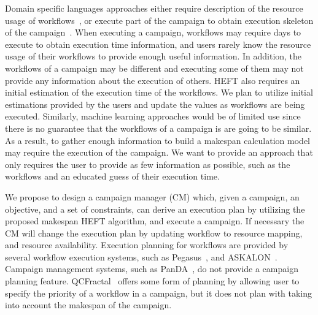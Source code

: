 Domain specific languages approaches either require description of the resource usage of workflows~\cite{carothers2017durango}, or execute part of the campaign to obtain execution skeleton of the campaign~\cite{maheshwari2016workflow}.
When executing a campaign, workflows may require days to execute to obtain execution time information, and users rarely know the resource usage of their workflows to provide enough useful information.
In addition, the workflows of a campaign may be different and executing some of them may not provide any information about the execution of others.
HEFT also requires an initial estimation of the execution time of the workflows. We plan to utilize initial estimations provided by the users and update the values as workflows are being executed.
Similarly, machine learning approaches would be of limited use since there is no guarantee that the workflows of a campaign is are going to be similar.
As a result, to gather enough information to build a makespan calculation model may require the execution of the campaign.
We want to provide an approach that only requires the user to provide as few information as possible, such as the workflows and an educated guess of their execution time.

We propose to design a campaign manager (CM) which, given a campaign, an objective, and a set of constraints, can derive an execution plan by utilizing the proposed makespan HEFT algorithm, and execute a campaign.
If necessary the CM will change the execution plan by updating workflow to resource mapping, and resource availability.
Execution planning for workflows are provided by several workflow execution systems, such as Pegasus~\cite{deelman2015pegasus}, and ASKALON~\cite{fahringer2005askalon}.
Campaign management systems, such as PanDA~\cite{maeno2008panda}, do not provide a campaign planning feature.
QCFractal~\cite{qcfractal} offers some form of planning by allowing user to specify the priority of a workflow in a campaign, but it does not plan with taking into account the makespan of the campaign.

